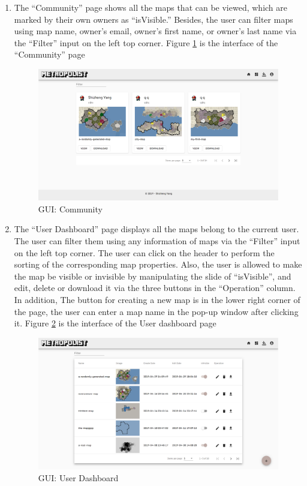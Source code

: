 \begin{enumerate}
  \item The ``Community'' page shows all the maps that can be viewed, which are marked by their own owners as ``isVisible.'' Besides, the user can filter maps using map name, owner's email, owner's first name, or owner's last name via the ``Filter'' input on the left top corner. Figure \ref{fig:GUI community} is the interface of the ``Community'' page

  \begin{figure}[htbp]
  \centering
  \includegraphics[width=\textwidth]{section04/assets/GUI-community.png}
  \caption[GUI: Community]{\label{fig:GUI community}GUI: Community}
  \end{figure}

  \item The ``User Dashboard'' page displays all the maps belong to the current user. The user can filter them using any information of maps via the ``Filter'' input on the left top corner. The user can click on the header to perform the sorting of the corresponding map properties. Also, the user is allowed to make the map be visible or invisible by manipulating the slide of ``isVisible'', and edit, delete or download it via the three buttons in the ``Operation'' column. In addition, The button for creating a new map is in the lower right corner of the page, the user can enter a map name in the pop-up window after clicking it. Figure \ref{fig:GUI user dashboard} is the interface of the User dashboard page

  \begin{figure}[htbp]
  \centering
  \includegraphics[width=\textwidth]{section04/assets/GUI-user.png}
  \caption[GUI: User Dashboard]{\label{fig:GUI user dashboard}GUI: User Dashboard}
  \end{figure}


\end{enumerate}

